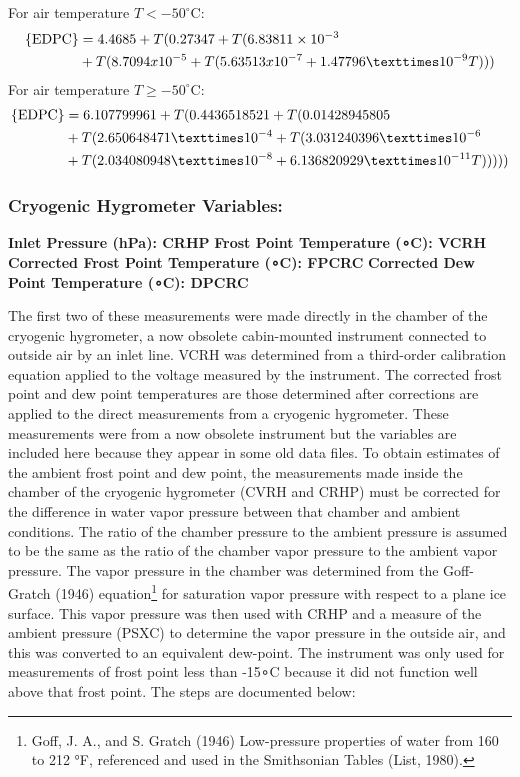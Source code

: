 \documentclass[
]{book}
\begin{document}
For air temperature \(T < -50^\circ\)C:\\
\begin{align}
\mathrm{\{EDPC\}} &= 4.4685 + T(0.27347 + T (6.83811\times 10^{-3}\notag \\
&+ T(8.7094x10^{-5} + T(5.63513x10^{-7} + 1.47796 × 10^{-9}T)))
\label{eq:EDPC1}
\end{align}
For air temperature \(T \ge -50^\circ\)C:\\
\begin{align}
\mathrm{\{EDPC\}} &= 6.107799961 + T(0.4436518521 + T(0.01428945805\notag \\
&+ T(2.650648471 × 10^{-4} + T(3.031240396 × 10^{-6}\notag \\
&+ T (2.034080948 × 10^{-8} + 6.136820929 × 10^{-11}T)))))
\label{eq:EDPC2}
\end{align}

\hypertarget{cryo-hygro}{%
\subsubsection*{Cryogenic Hygrometer Variables:}\label{cryo-hygro}}

\textbf{Inlet Pressure (hPa): CRHP}
\textbf{Frost Point Temperature ({∘C}): VCRH}
\textbf{Corrected Frost Point Temperature ({∘C}): FPCRC}
\textbf{Corrected Dew Point Temperature ({∘C}): DPCRC}

The first two of these measurements were made directly in the chamber of the cryogenic hygrometer, a now obsolete cabin-mounted instrument connected to outside air by an inlet line. VCRH was determined from a third-order calibration equation applied to the voltage measured by the instrument.
The corrected frost point and dew point temperatures are those determined after corrections are applied to the direct measurements from a cryogenic hygrometer. These measurements were from a now obsolete instrument but the variables are included here because they appear in some old data files. To obtain estimates of the ambient frost point and dew point, the measurements made inside the chamber of the cryogenic hygrometer (CVRH and CRHP) must be corrected for the difference in water vapor pressure between that chamber and ambient conditions. The ratio of the chamber pressure to the ambient pressure is assumed to be the same as the ratio of the chamber vapor pressure to the ambient vapor pressure. The vapor pressure in the chamber was determined from the Goff-Gratch (1946) equation\footnote{Goff, J. A., and S. Gratch (1946) Low-pressure properties of water from 160 to 212 °F, referenced and used in the Smithsonian Tables (List, 1980).}
for saturation vapor pressure with respect to a plane ice surface. This vapor pressure was then used with CRHP and a measure of the ambient pressure (PSXC) to determine the vapor pressure in the outside air, and this was converted to an equivalent dew-point. The instrument was only used for measurements of frost point less than -15{∘}C because it did not function well above that frost point. The steps are documented below:
\end{document}
